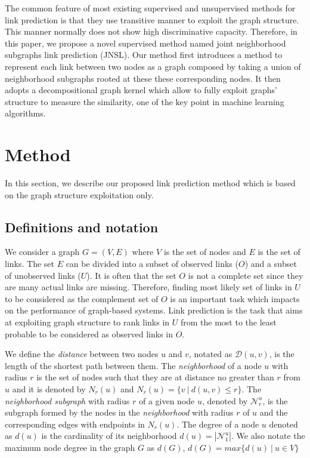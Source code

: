 \documentclass[runningheads,a4paper]{llncs}
\begin{document}
The common feature of most existing supervised and unsupervised methods for link prediction is that they use transitive manner to exploit the graph structure. This manner normally does not show high discriminative capacity. Therefore, in this paper, we propose a novel supervised method named joint neighborhood subgraphs link prediction (JNSL). Our method first introduces a method to represent each link between two nodes as a graph composed by taking a union of neighborhood subgraphs rooted at these these corresponding nodes. It then adopts a decompositional graph kernel which allow to fully exploit graphs' structure to measure the similarity, one of the key point in machine learning algorithms.

\section{Method}
In this section, we describe our proposed link prediction method which is based on the graph structure exploitation only.
\subsection{Definitions and notation}
We consider a graph $G=(V,E)$ where $V$ is the set of nodes and $E$ is the set of links. The set $E$ can be divided into a subset of observed links ($O$) and a subset of unobserved links ($U$). It is often that the set $O$ is not a complete set since they are many actual links are missing. Therefore, finding most likely set of links in $U$ to be considered as the complement set of $O$ is an important task which impacts on the performance of graph-based systems. Link prediction is the task that aims at exploiting graph structure to rank links in $U$ from the most to the least probable to be considered as observed links in $O$.

We define the \textit{distance} between two nodes $u$ and $v$, notated as $\mathcal{D}(u,v)$, is the length of the shortest path between them. The \textit{neighborhood} of a node $u$ with radius $r$ is the set of nodes such that they are at distance no greater than $r$ from $u$ and it is denoted by $N_r(u)$ and $N_r(u) = \lbrace v\ |\ d(u,v) \leq r \rbrace$. The \textit{neighborhood subgraph} with radius $r$ of a given node $u$, denoted by $\mathcal{N}_{r}^{u}$, is the subgraph formed by the nodes in the
\textit{neighborhood} with radius $r$ of $u$ and the corresponding edges with endpoints in $N_r(u)$. The degree of a node $u$ denoted as $d(u)$ is the cardinality of its neighborhood $d(u) = |\mathcal{N}_{1}^{u}|$. We also notate the maximum node degree in the graph $G$ as $d(G)$, $d(G) = max\lbrace d(u)\ |\ u \in V \rbrace$
\end{document}
